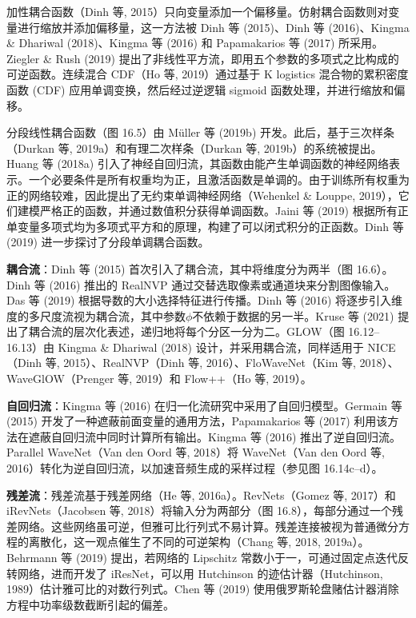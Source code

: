 \documentclass[lang=cn,newtx,10pt,scheme=chinese]{elegantbook}
\begin{document}
加性耦合函数（Dinh 等, 2015）只向变量添加一个偏移量。仿射耦合函数则对变量进行缩放并添加偏移量，这一方法被 Dinh 等 (2015)、Dinh 等 (2016)、Kingma \& Dhariwal (2018)、Kingma 等 (2016) 和 Papamakarios 等 (2017) 所采用。Ziegler \& Rush (2019) 提出了非线性平方流，即用五个参数的多项式之比构成的可逆函数。连续混合 CDF（Ho 等, 2019）通过基于 K logistics 混合物的累积密度函数 (CDF) 应用单调变换，然后经过逆逻辑 sigmoid 函数处理，并进行缩放和偏移。

分段线性耦合函数（图 16.5）由 Müller 等 (2019b) 开发。此后，基于三次样条（Durkan 等, 2019a）和有理二次样条（Durkan 等, 2019b）的系统被提出。Huang 等 (2018a) 引入了神经自回归流，其函数由能产生单调函数的神经网络表示。一个必要条件是所有权重均为正，且激活函数是单调的。由于训练所有权重为正的网络较难，因此提出了无约束单调神经网络（Wehenkel \& Louppe, 2019），它们建模严格正的函数，并通过数值积分获得单调函数。Jaini 等 (2019) 根据所有正单变量多项式均为多项式平方和的原理，构建了可以闭式积分的正函数。Dinh 等 (2019) 进一步探讨了分段单调耦合函数。

\textbf{耦合流}：Dinh 等 (2015) 首次引入了耦合流，其中将维度分为两半（图 16.6）。Dinh 等 (2016) 推出的 RealNVP 通过交替选取像素或通道块来分割图像输入。Das 等 (2019) 根据导数的大小选择特征进行传播。Dinh 等 (2016) 将逐步引入维度的多尺度流视为耦合流，其中参数\(\phi\)不依赖于数据的另一半。Kruse 等 (2021) 提出了耦合流的层次化表述，递归地将每个分区一分为二。GLOW（图 16.12–16.13）由 Kingma \& Dhariwal (2018) 设计，并采用耦合流，同样适用于 NICE（Dinh 等, 2015）、RealNVP（Dinh 等, 2016）、FloWaveNet（Kim 等, 2018）、WaveGlOW（Prenger 等, 2019）和 Flow++（Ho 等, 2019）。

\textbf{自回归流}：Kingma 等 (2016) 在归一化流研究中采用了自回归模型。Germain 等 (2015) 开发了一种遮蔽前面变量的通用方法，Papamakarios 等 (2017) 利用该方法在遮蔽自回归流中同时计算所有输出。Kingma 等 (2016) 推出了逆自回归流。Parallel WaveNet（Van den Oord 等, 2018）将 WaveNet（Van den Oord 等, 2016）转化为逆自回归流，以加速音频生成的采样过程（参见图 16.14c–d）。

\textbf{残差流}：残差流基于残差网络（He 等, 2016a）。RevNets（Gomez 等, 2017）和 iRevNets（Jacobsen 等, 2018）将输入分为两部分（图 16.8），每部分通过一个残差网络。这些网络虽可逆，但雅可比行列式不易计算。残差连接被视为普通微分方程的离散化，这一观点催生了不同的可逆架构（Chang 等, 2018, 2019a）。Behrmann 等 (2019) 提出，若网络的 Lipschitz 常数小于一，可通过固定点迭代反转网络，进而开发了 iResNet，可以用 Hutchinson 的迹估计器（Hutchinson, 1989）估计雅可比的对数行列式。Chen 等 (2019) 使用俄罗斯轮盘赌估计器消除方程中功率级数截断引起的偏差。
\end{document}
